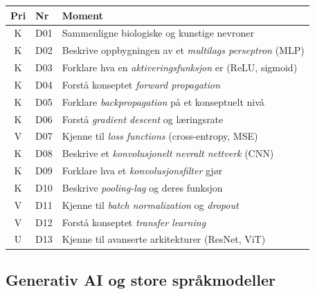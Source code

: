 \documentclass[11pt,a4paper]{article}
\begin{document}
\begin{longtable}{@{}clp{9cm}@{}}
\toprule
\textbf{Pri} & \textbf{Nr} & \textbf{Moment} \\
\midrule
\endfirsthead
\midrule
\endhead
\midrule
\endfoot
\bottomrule
\endlastfoot
K & D01 & Sammenligne biologiske og kunstige nevroner \\
K & D02 & Beskrive oppbygningen av et \emph{multilags perseptron} (MLP) \\
K & D03 & Forklare hva en \emph{aktiveringsfunksjon} er (ReLU, sigmoid) \\
K & D04 & Forstå konseptet \emph{forward propagation} \\
K & D05 & Forklare \emph{backpropagation} på et konseptuelt nivå \\
K & D06 & Forstå \emph{gradient descent} og læringsrate \\
V & D07 & Kjenne til \emph{loss functions} (cross-entropy, MSE) \\
K & D08 & Beskrive et \emph{konvolusjonelt nevralt nettverk} (CNN) \\
K & D09 & Forklare hva et \emph{konvolusjonsfilter} gjør \\
K & D10 & Beskrive \emph{pooling-lag} og deres funksjon \\
V & D11 & Kjenne til \emph{batch normalization} og \emph{dropout} \\
V & D12 & Forstå konseptet \emph{transfer learning} \\
U & D13 & Kjenne til avanserte arkitekturer (ResNet, ViT) \\
\end{longtable}

\subsection{Generativ AI og store språkmodeller}
\end{document}
